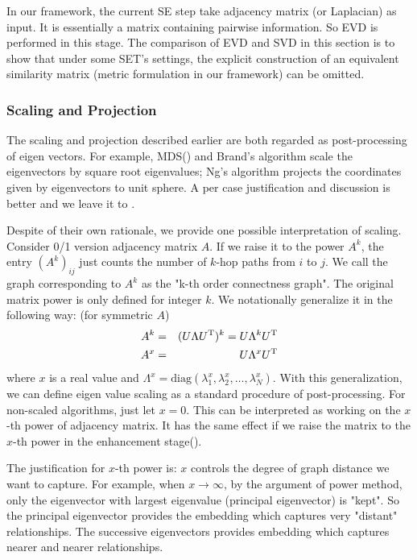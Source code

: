 In our framework, the current SE step take adjacency matrix
(or Laplacian) as input. It is essentially a matrix containing 
pairwise information. So EVD is performed in this stage. 
The comparison of EVD and SVD in this section is to show that 
under some SET's settings, the explicit construction of an 
equivalent similarity matrix (metric formulation in our framework)
can be omitted. 

\subsubsection{Scaling and Projection}

The scaling and projection described earlier are 
both regarded as post-processing of eigen vectors. 
For example, MDS(\rsec{\ref{sec:mds}}) and Brand's algorithm
\cite{brand2003unifying} scale the eigenvectors by square root
eigenvalues; Ng's algorithm \cite{ng2002spectral} projects 
the coordinates given by eigenvectors to unit sphere. 
A per case justification and discussion is better and 
we leave it to \rsec{\ref{sec:justification}}. 

Despite of their own rationale, we provide one possible interpretation 
of scaling. Consider 0/1 version adjacency matrix $ A $. If we raise it to the power
$ A^k $, the entry $ (A^k)_{ij} $ just counts the number of $ k $-hop paths 
from $ i $ to $ j $. 
We call the graph corresponding to $ A^k $ as the "k-th order connectness graph". 
The original matrix power is only defined for 
integer $ k $. We notationally generalize it in the following way:
(for symmetric $ A $)
\begin{eqnarray}
	A^k &=& (U \Lambda U^\mathrm{T})^k = U \Lambda^k U^\mathrm{T} \\
	A^x &=& U \Lambda^x U^\mathrm{T} 
\end{eqnarray}
where $ x $ is a real value and 
$ \Lambda^x = \text{diag}(\lambda_1^x, \lambda_2^x, \ldots, \lambda_N^x) $. 
With this generalization, we can define eigen value scaling as 
a standard procedure of post-processing. For non-scaled algorithms, 
just let $ x=0 $. This can be interpreted as working on the $ x $-th
power of adjacency matrix. It has the same effect if we raise the matrix
to the $ x $-th power in the enhancement stage(\rsec{\ref{sec:enhance}}). 

The justification for $ x $-th power is: $ x $ controls the degree
of graph distance we want to capture. For example, when $ x \rightarrow \infty $, 
by the argument of power method, only the eigenvector with largest eigenvalue 
(principal eigenvector) is "kept". So the principal eigenvector provides 
the embedding which captures very "distant" relationships. The successive 
eigenvectors provides embedding which captures nearer and nearer relationships. 

